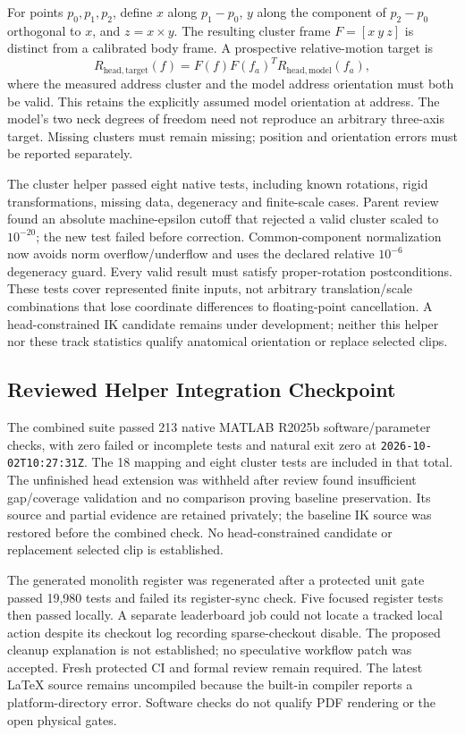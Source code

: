 \documentclass[11pt,a4paper]{article}
\begin{document}
For points $p_0,p_1,p_2$, define $x$ along $p_1-p_0$, $y$ along the
component of $p_2-p_0$ orthogonal to $x$, and $z=x\times y$.
The resulting cluster frame $F=[x\ y\ z]$ is distinct from a calibrated
body frame. A prospective relative-motion target is
\[
  R_{\mathrm{head,target}}(f)
  =F(f)F(f_a)^T R_{\mathrm{head,model}}(f_a),
\]
where the measured address cluster and the model address orientation
must both be valid. This retains the explicitly assumed model orientation
at address. The model's two neck degrees of freedom need not reproduce
an arbitrary three-axis target. Missing clusters must remain missing;
position and orientation errors must be reported separately.

The cluster helper passed eight native tests, including known rotations,
rigid transformations, missing data, degeneracy and finite-scale cases.
Parent review found an absolute machine-epsilon cutoff that rejected a
valid cluster scaled to $10^{-20}$; the new test failed before correction.
Common-component normalization now avoids norm overflow/underflow and
uses the declared relative $10^{-6}$ degeneracy guard. Every valid result
must satisfy proper-rotation postconditions. These tests cover represented
finite inputs, not arbitrary translation/scale combinations that lose
coordinate differences to floating-point cancellation. A head-constrained
IK candidate remains under development; neither this helper nor these
track statistics qualify anatomical orientation or replace selected clips.

\subsection{Reviewed Helper Integration Checkpoint}
The combined suite passed 213 native MATLAB R2025b software/parameter checks,
with zero failed or incomplete tests and natural exit zero at
\texttt{2026-10-02T10:27:31Z}. The 18 mapping and eight cluster tests are
included in that total. The unfinished head extension was withheld after
review found insufficient gap/coverage validation and no comparison proving
baseline preservation. Its source and partial evidence are retained privately;
the baseline IK source was restored before the combined check. No
head-constrained candidate or replacement selected clip is established.

The generated monolith register was regenerated after a protected unit gate
passed 19,980 tests and failed its register-sync check. Five focused register
tests then passed locally. A separate leaderboard job could not locate a
tracked local action despite its checkout log recording sparse-checkout
disable. The proposed cleanup explanation is not established; no speculative
workflow patch was accepted. Fresh protected CI and formal review remain
required. The latest LaTeX source remains uncompiled because the built-in
compiler reports a platform-directory error. Software checks do not qualify
PDF rendering or the open physical gates.
\end{document}
